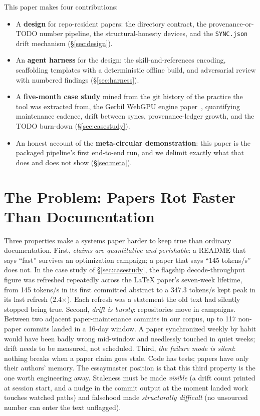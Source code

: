 \documentclass{article}
\begin{document}
This paper makes four contributions:
\begin{itemize}
  \item A \textbf{design} for repo-resident papers: the directory contract, the
  provenance-or-TODO number pipeline, the structural-honesty devices, and the
  \texttt{SYNC.json} drift mechanism (\S\ref{sec:design}).
  \item An \textbf{agent harness} for the design: the skill-and-references encoding,
  scaffolding templates with a deterministic offline build, and adversarial review
  with numbered findings (\S\ref{sec:harness}).
  \item A \textbf{five-month case study} mined from the git history of the practice
  the tool was extracted from, the Gerbil WebGPU engine paper~\citep{gerbil},
  quantifying maintenance cadence, drift between syncs, provenance-ledger growth, and
  the TODO burn-down (\S\ref{sec:casestudy}).
  \item An honest account of the \textbf{meta-circular demonstration}: this paper is
  the packaged pipeline's first end-to-end run, and we delimit exactly what that does
  and does not show (\S\ref{sec:meta}).
\end{itemize}

\section{The Problem: Papers Rot Faster Than Documentation}
\label{sec:problem}

Three properties make a systems paper harder to keep true than ordinary
documentation. First, \emph{claims are quantitative and perishable}: a README that
says ``fast'' survives an optimization campaign; a paper that says ``145 tokens/s''
does not. In the case study of \S\ref{sec:casestudy}, the flagship decode-throughput
figure was refreshed repeatedly across the LaTeX paper's seven-week lifetime, from
145 tokens/s in its first committed abstract to a 347.3 tokens/s kept peak in its
last refresh (2.4$\times$). Each refresh was a statement the old text had silently
stopped being true.
Second, \emph{drift is bursty}: repositories move in campaigns. Between two adjacent
paper-maintenance commits in our corpus, up to 117 non-paper commits landed in a
16-day window. A paper synchronized weekly by habit would have been badly wrong
mid-window and needlessly touched in quiet weeks; drift needs to be measured, not
scheduled.
Third, \emph{the failure mode is silent}: nothing breaks when a paper claim goes
stale. Code has tests; papers have only their authors' memory. The essaymaster
position is that this third property is the one worth engineering away. Staleness
must be made \emph{visible} (a drift count printed at session start, and a nudge in
the commit output at the moment landed work touches watched paths) and falsehood
made \emph{structurally difficult} (no unsourced number can enter the text
unflagged).
\end{document}
